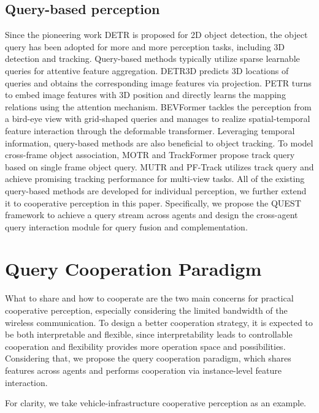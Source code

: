 \documentclass[letterpaper, 10 pt, conference]{ieeeconf}  %
\begin{document}
\subsection{Query-based perception}

Since the pioneering work DETR \cite{detr} is proposed for 2D object detection, the object query has been adopted for more and more perception tasks, including 3D detection and tracking. Query-based methods typically utilize sparse learnable queries for attentive feature aggregation. DETR3D \cite{detr3d} predicts 3D locations of queries and obtains the corresponding image features via projection. PETR \cite{petr} turns to embed image features with 3D position and directly learns the mapping relations using the attention mechanism. BEVFormer \cite{bevformer, bevformerv2} tackles the perception from a bird-eye view with grid-shaped queries and manages to realize spatial-temporal feature interaction through the deformable transformer. Leveraging temporal information, query-based methods are also beneficial to object tracking. To model cross-frame object association, MOTR \cite{motr} and TrackFormer \cite{trackformer} propose track query based on single frame object query. MUTR \cite{mutr} and PF-Track \cite{pftr} utilizes track query and achieve promising tracking performance for multi-view tasks. All of the existing query-based methods are developed for individual perception, we further extend it to cooperative perception in this paper. Specifically, we propose the QUEST framework to achieve a query stream across agents and design the cross-agent query interaction module for query fusion and complementation.

\section{Query Cooperation Paradigm}

What to share and how to cooperate are the two main concerns for practical cooperative perception, especially considering the limited bandwidth of the wireless communication. To design a better cooperation strategy, it is expected to be both interpretable and flexible, since interpretability leads to controllable cooperation and flexibility provides more operation space and possibilities. Considering that, we propose the query cooperation paradigm, which shares features across agents and performs cooperation via instance-level feature interaction. 

For clarity, we take vehicle-infrastructure cooperative perception as an example.
\end{document}
